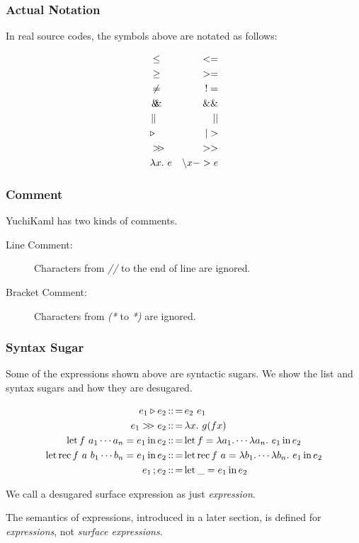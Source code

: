 \subsubsection{Actual Notation}

In real source codes, the symbols above are notated as follows:

\begin{align*}
    &\leq & <=\\
    &\geq & >=\\
    &\not= & !=\\
    &\logAnd & \&\&\\
    &\logOr & ||\\
    &\triangleright & |>\\
    &\composition & >>\\
    &\abs{x}{e} & \backslash x -> e
\end{align*}


\subsubsection{Comment}

YuchiKaml has two kinds of comments.

\begin{description}
    \item[Line Comment:]
        Characters from \emph{//} to the end of line are ignored.
    \item[Bracket Comment:]
        Characters from \emph{(*} to \emph{*)} are ignored.
\end{description}


\subsubsection{Syntax Sugar}
Some of the expressions shown above are syntactic sugars.
We show the list and syntax sugars and how they are desugared.

\begin{align*}
        e_1 \triangleright e_2 &\defeq e_2\ e_1 \\
        e_1 \composition e_2 &\defeq \abs{x}{g (f x)}\\
        \letStructure{f\ a_{1} \cdots a_n}{e_1}{e_2}&\defeq
            \letStructure{f}{\lambda a_1 . \cdots \lambda a_n.\ {e_1}}{e_2}\\
        \letRecStructure{f}{a\ b_{1} \cdots b_n}{e_1}{e_2}&\defeq
            \letRecStructure{f}{a}{\lambda b_1 . \cdots \lambda b_n.\ {e_1}}{e_2}\\
        e_1\opCol{}e_2 &\defeq \letStructure{\_}{e_1}{e_2}
\end{align*}

\begin{definition}[expression]
    We call a desugared surface expression as just \emph{expression}.
\end{definition}

The semantics of expressions, introduced in a later section, is defined for \emph{expressions}, not \emph{surface expressions}.
